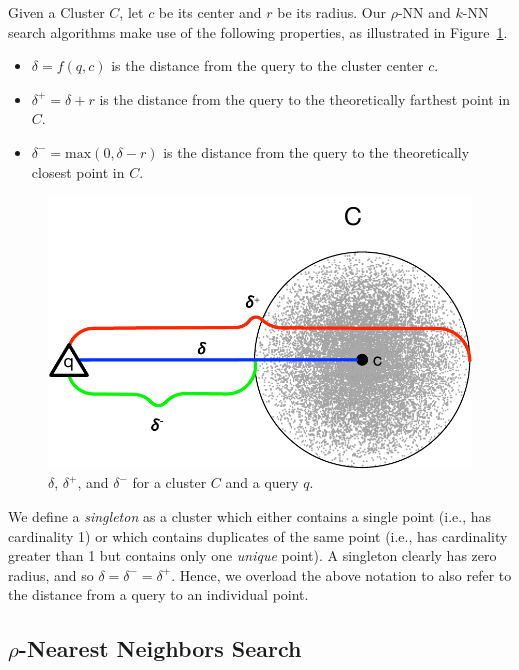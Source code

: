 Given a Cluster $C$, let $c$ be its center and $r$ be its radius.
Our $\rho$-NN and $k$-NN search algorithms make use of the following properties, as illustrated in Figure~\ref{fig:methods:deltas}.

\begin{itemize}
    \item $\delta = f(q, c)$ is the distance from the query to the cluster center $c$.
    \item $\delta^{+} = \delta + r$ is the distance from the query to the theoretically farthest point in $C$.
    \item $\delta^{-} = \text{max}(0, \delta - r)$ is the distance from the query to the theoretically closest point in $C$.
\end{itemize}

\begin{figure}[ht!]
    \centering
    \includegraphics[scale=0.8]{images/geometry/deltas.pdf}
    \caption{{\color{blue}$\delta$}, {\color{red}$\delta^{+}$}, and {\color{green}$\delta^{-}$} for a cluster $C$ and a query $q$.}
    \label{fig:methods:deltas}
\end{figure}

We define a \emph{singleton} as a cluster which either contains a single point (i.e., has cardinality 1) or which contains duplicates of the same point (i.e., has cardinality greater than 1 but contains only one \emph{unique} point).
A singleton clearly has zero radius, and so $\delta = \delta^{-} = \delta^{+}$.
Hence, we overload the above notation to also refer to the distance from a query to an individual point.


\subsection{\texorpdfstring{$\rho$}{p}-Nearest Neighbors Search}
\label{sec:methods:rnn-search}

